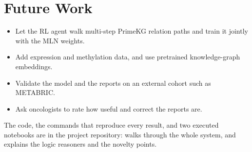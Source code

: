 \documentclass{mnnit}
\begin{document}
\section{Future Work}
\begin{itemize}
  \item Let the RL agent walk multi-step PrimeKG relation paths and train it jointly with the MLN weights.
  \item Add expression and methylation data, and use pretrained knowledge-graph embeddings.
  \item Validate the model and the reports on an external cohort such as METABRIC.
  \item Ask oncologists to rate how useful and correct the reports are.
\end{itemize}

\noindent The code, the commands that reproduce every result, and two executed notebooks are in the project
repository:  walks through the whole system, and
 explains the logic reasoners and the novelty points.

\renewcommand{\baselinestretch}{1.0}\normalsize
\end{document}
